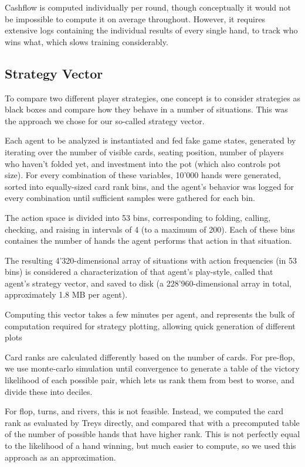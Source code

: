 
Cashflow is computed individually per round, though conceptually it would not be impossible to compute it on average throughout. However, it requires extensive logs containing the individual results of every single hand, to track who wins what, which slows training considerably.


\subsection{Strategy Vector}
\label{StrategyVectorComputation}
To compare two different player strategies, one concept is to consider strategies as black boxes and compare how they behave in a number of situations. This was the approach we chose for our so-called strategy vector.

Each agent to be analyzed is instantiated and fed fake game states, generated by iterating over the number of visible cards, seating position, number of players who haven't folded yet, and investment into the pot (which also controls pot size). For every combination of these variables, 10'000 hands were generated, sorted into equally-sized card rank bins, and the agent's behavior was logged for every combination until sufficient samples were gathered for each bin.

The action space is divided into 53 bins, corresponding to folding, calling, checking, and raising in intervals of 4 (to a maximum of 200). Each of these bins containes the number of hands the agent performs that action in that situation.

The resulting 4'320-dimensional array of situations with action frequencies (in 53 bins) is considered a characterization of that agent's play-style, called that agent's strategy vector, and saved to disk (a 228'960-dimensional array in total, approximately 1.8 MB per agent).

Computing this vector takes a few minutes per agent, and represents the bulk of computation required for strategy plotting, allowing quick generation of different plots

Card ranks are calculated differently based on the number of cards. For pre-flop, we use monte-carlo simulation until convergence to generate a table of the victory likelihood of each possible pair, which lets us rank them from best to worse, and divide these into deciles.

For flop, turns, and rivers, this is not feasible. Instead, we computed the card rank as evaluated by Treys \cite{Treys} directly, and compared that with a precomputed table of the number of possible hands that have higher rank. This is not perfectly equal to the likelihood of a hand winning, but much easier to compute, so we used this approach as an approximation. 

